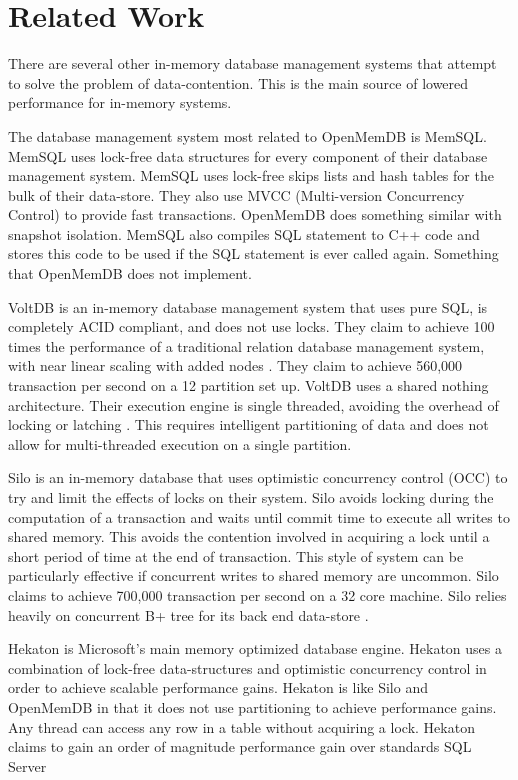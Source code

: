 \documentclass[conference, compsoc]{IEEEtran}
\begin{document}
\section{Related Work}
There are several other in-memory database management systems that attempt to solve the 
problem of data-contention. This is the main source of lowered performance for in-memory systems.
\par\vspace{\baselineskip}
The database management system most related to OpenMemDB is MemSQL.
MemSQL uses lock-free data structures for every component of their database management
system. MemSQL uses lock-free skips lists and hash tables for the bulk of their data-store\cite{MemSQL}.
They also use MVCC (Multi-version Concurrency Control) to provide fast transactions. 
OpenMemDB does something similar with snapshot isolation. MemSQL also compiles SQL
statement to C++ code and stores this code to be used if the SQL statement is ever called
again. Something that OpenMemDB does not implement.
\par\vspace{\baselineskip}
VoltDB is an in-memory database management system that uses pure SQL, is completely ACID
compliant, and does not use locks. They claim to achieve 100 times the performance of 
a traditional relation database management system, with near linear scaling with added nodes \cite{voltdb2010voltdb}. They claim to achieve 560,000 transaction per second on a 12
partition set up. 
VoltDB uses a shared nothing architecture. Their execution engine is single threaded, 
avoiding the overhead of locking or latching \cite{voltdb2010voltdb}. This requires
intelligent partitioning of data and does not allow for multi-threaded execution 
on a single partition. 
\par\vspace{\baselineskip}
Silo is an in-memory database that uses optimistic concurrency control (OCC) to try and 
limit the effects of locks on their system. Silo avoids locking during the computation
of a transaction and waits until commit time to execute all writes to shared memory.
This avoids the contention involved in acquiring a lock until a short period of time 
at the end of transaction. This style of system can be particularly effective if
concurrent writes to shared memory are uncommon. Silo claims to achieve 700,000
transaction per second on a 32 core machine. Silo relies heavily on concurrent 
B+ tree for its back end data-store \cite{tu2013speedy}. 
\par\vspace{\baselineskip}
Hekaton is Microsoft's main memory optimized database engine.
Hekaton uses a combination of lock-free data-structures and optimistic concurrency control
in order to achieve scalable performance gains. Hekaton is like Silo and OpenMemDB in that 
it does not use partitioning to achieve performance gains. Any thread can access any 
row in a table without acquiring a lock\cite{diaconu2013hekaton}. Hekaton claims to gain
an order of magnitude performance gain over standards SQL Server\cite{diaconu2013hekaton}
\end{document}
